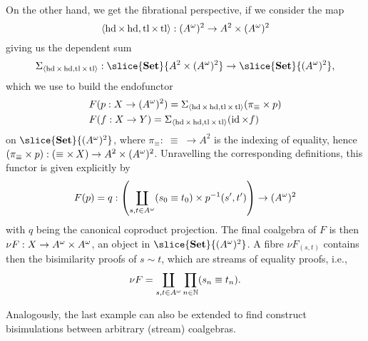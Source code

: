 \documentclass[runningheads,envcountsame,envcountsect,orivec]{llncs}
\begin{document}
\begin{example}[Bisimilarity]
  On the other hand, we get the fibrational perspective, if we consider the
  map
  \begin{equation*}
    \langle \operatorname{hd} \times \operatorname{hd}, \operatorname{tl} \times \operatorname{tl} \rangle :
    ({A}^{\omega})^2 \to A^2 \times ({A}^{\omega})^2
  \end{equation*}
  giving us the dependent sum
  \begin{equation*}
    \Sigma_{\prodArr{\head \times \head, \tail \times \tail}} :
    \slice{\SetC}{A^2 \times (\Str{A})^2} \to \slice{\SetC}{(\Str{A})^2},
  \end{equation*}
  which we use to build the endofunctor
  \begin{align*}
    & F(p : X \to ({A}^{\omega})^2) =
      \Sigma_{\langle \operatorname{hd} \times \operatorname{hd}, \operatorname{tl} \times \operatorname{tl} \rangle}
      (\pi_\equiv \times p) \\
    & F(f : X \to Y) = 
      \Sigma_{\langle \operatorname{hd} \times \operatorname{hd}, \operatorname{tl} \times \operatorname{tl} \rangle}(\operatorname{id} \times f)
  \end{align*}
  on $\slice{\SetC}{(\Str{A})^2}$, where $\pi_\equiv : \; \equiv \; \to A^2$ is
  the indexing of equality, hence
  $(\pi_{\equiv} \times p) : (\equiv \times \, X) \to A^2 \times ({A}^{\omega})^2$.
  Unravelling the corresponding definitions, this functor is given explicitly by
  \begin{equation*}
    F(p) =
    q :
    \left(\coprod_{s,t \in {A}^{\omega}} (s_0 \equiv t_0) \times p^{-1}(s',t') \right)
    \to
    ({A}^{\omega})^2
  \end{equation*}
  with $q$ being the canonical coproduct projection.
  The final coalgebra of $F$ is then $\nu F : X \to {A}^{\omega} \times {A}^{\omega}$, an
  object in $\slice{\SetC}{(\Str{A})^2}$.
  A fibre $\nu F_{(s,t)}$ contains then the bisimilarity proofs of $s \sim t$,
  which are streams of equality proofs, i.e.,
  \begin{equation*}
    \nu F = \coprod_{s,t \in {A}^{\omega}} \prod_{n \in \mathbb{N}} (s_n \equiv t_n).
  \end{equation*}
\end{example}

Analogously, the last example can also be extended to find construct
bisimulations between arbitrary (stream) coalgebras.
\end{document}
